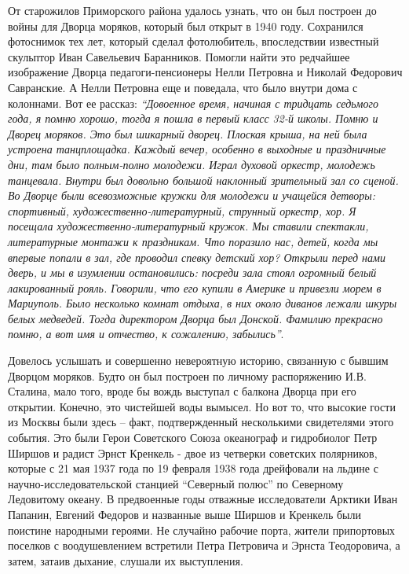 От старожилов Приморского района удалось узнать, что он был построен до войны
для Дворца моряков, который был открыт в 1940 году. Сохранился фотоснимок тех
лет, который сделал фотолюбитель, впоследствии известный скульптор Иван
Савельевич Баранников. Помогли найти это редчайшее изображение Дворца
педагоги-пенсионеры Нелли Петровна и Николай Федорович Савранские. А Нелли
Петровна еще и поведала, что было внутри дома с колоннами. Вот ее рассказ:
\emph{\enquote{Довоенное время, начиная с тридцать седьмого года, я помню хорошо, тогда я
пошла в первый класс 32-й школы. Помню и Дворец моряков. Это был шикарный
дворец. Плоская крыша, на ней была устроена танцплощадка. Каждый вечер,
особенно в выходные и праздничные дни, там было полным-полно молодежи. Играл
духовой оркестр, молодежь танцевала. Внутри был довольно большой наклонный
зрительный зал со сценой. Во Дворце были всевозможные кружки для молодежи и
учащейся детворы: спортивный, художественно-литературный, струнный оркестр,
хор. Я посещала художественно-литературный кружок. Мы ставили спектакли,
литературные монтажи к праздникам. Что поразило нас, детей, когда мы впервые
попали в зал, где проводил спевку детский хор? Открыли перед нами дверь, и мы в
изумлении остановились: посреди зала стоял огромный белый лакированный рояль.
Говорили, что его купили в Америке и привезли морем в Мариуполь. Было несколько
комнат отдыха, в них около диванов лежали шкуры белых медведей. Тогда
директором Дворца был Донской. Фамилию прекрасно помню, а вот имя и отчество, к
сожалению, забылись}}.

Довелось услышать и совершенно невероятную историю, связанную с бывшим Дворцом
моряков. Будто он был построен по личному распоряжению И.В. Сталина, мало того,
вроде бы вождь выступал с балкона Дворца при его открытии. Конечно, это
чистейшей воды вымысел. Но вот то, что высокие гости из Москвы были здесь –
факт, подтвержденный несколькими свидетелями этого события. Это были Герои
Советского Союза океанограф и гидробиолог Петр Ширшов и радист Эрнст Кренкель -
двое из четверки советских полярников, которые с 21 мая 1937 года по 19 февраля
1938 года дрейфовали на льдине с научно-исследовательской станцией \enquote{Северный
полюс} по Северному Ледовитому океану. В предвоенные годы отважные
исследователи Арктики Иван Папанин, Евгений Федоров и названные выше Ширшов и
Кренкель были поистине народными героями. Не случайно рабочие порта, жители
припортовых поселков с воодушевлением встретили Петра Петровича и Эрнста
Теодоровича, а затем, затаив дыхание, слушали их выступления.

